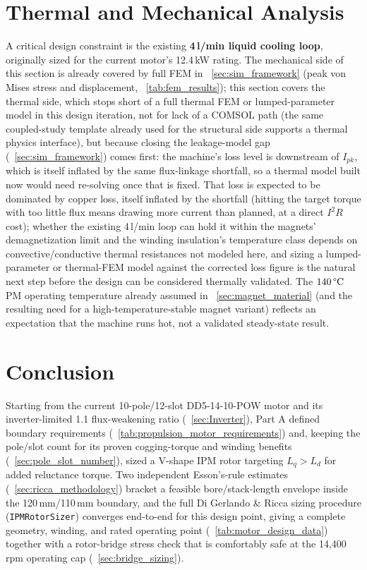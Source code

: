 \documentclass[10pt,final,journal,a4paper,oneside,twocolumn]{IEEEtran}
\begin{document}
\section{Thermal and Mechanical Analysis}
\label{SEC:Thermal}
A critical design constraint is the existing \textbf{4\,l/min liquid cooling loop}, originally sized for the current motor's 12.4\,kW rating. The mechanical side of this section is already covered by full FEM in \sectionname~\ref{sec:sim_framework} (peak von Mises stress and displacement, \tablename~\ref{tab:fem_results}); this section covers the thermal side, which stops short of a full thermal FEM or lumped-parameter model in this design iteration, not for lack of a COMSOL path (the same coupled-study template already used for the structural side supports a thermal physics interface), but because closing the leakage-model gap (\sectionname~\ref{sec:sim_framework}) comes first: the machine's loss level is downstream of $I_{pk}$, which is itself inflated by the same flux-linkage shortfall, so a thermal model built now would need re-solving once that is fixed. That loss is expected to be dominated by copper loss, itself inflated by the shortfall (hitting the target torque with too little flux means drawing more current than planned, at a direct $I^2R$ cost); whether the existing 4\,l/min loop can hold it within the magnets' demagnetization limit and the winding insulation's temperature class depends on convective/conductive thermal resistances not modeled here, and sizing a lumped-parameter or thermal-FEM model against the corrected loss figure is the natural next step before the design can be considered thermally validated. The $140\,\text{\textdegree{}C}$ PM operating temperature already assumed in \sectionname~\ref{sec:magnet_material} (and the resulting need for a high-temperature-stable magnet variant) reflects an expectation that the machine runs hot, not a validated steady-state result.

\section{Conclusion}
\label{SEC:Conclusion}
Starting from the current 10-pole/12-slot DD5-14-10-POW motor and its inverter-limited 1.1 flux-weakening ratio (\sectionname~\ref{sec:Inverter}), Part A defined boundary requirements (\tablename~\ref{tab:propulsion_motor_requirements}) and, keeping the pole/slot count for its proven cogging-torque and winding benefits (\sectionname~\ref{sec:pole_slot_number}), sized a V-shape IPM rotor targeting $L_q>L_d$ for added reluctance torque. Two independent Esson's-rule estimates (\sectionname~\ref{sec:ricca_methodology}) bracket a feasible bore/stack-length envelope inside the 120\,mm/110\,mm boundary, and the full Di Gerlando \& Ricca sizing procedure (\texttt{IPMRotorSizer}) converges end-to-end for this design point, giving a complete geometry, winding, and rated operating point (\tablename~\ref{tab:motor_design_data}) together with a rotor-bridge stress check that is comfortably safe at the 14,400\,rpm operating cap (\sectionname~\ref{sec:bridge_sizing}).
\end{document}
